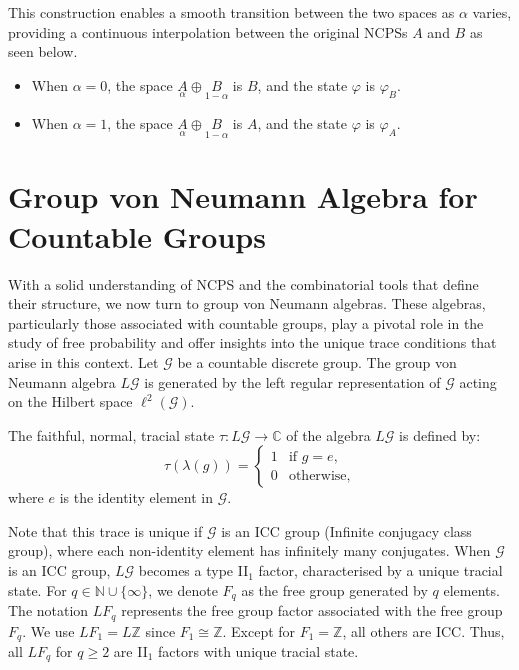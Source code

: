 This construction enables a smooth transition between the two spaces as $\alpha$ varies, providing a continuous interpolation between the original NCPSs $A$ and $B$ as seen below.

\begin{itemize}
    \item When $\alpha=0$, the space $\underset{\alpha}{A} \oplus \underset{1-\alpha}{B}$ is $B$, and the state $\varphi$ is $\varphi_B$.
    \item When $\alpha =1$, the space $\underset{\alpha}{A} \oplus \underset{1-\alpha}{B}$ is $A$, and the state $\varphi$ is $\varphi_A$.
\end{itemize}

\section{Group von Neumann Algebra for Countable Groups}\label{sec:gp-von}
With a solid understanding of NCPS and the combinatorial tools that define their structure, we now turn to group von Neumann algebras. These algebras, particularly those associated with countable groups, play a pivotal role in the study of free probability and offer insights into the unique trace conditions that arise in this context. Let $\mathcal{G}$ be a countable discrete group. The group von Neumann algebra $L\mathcal{G}$ is generated by the left regular representation of $\mathcal{G}$ acting on the Hilbert space $\ell^2(\mathcal{G})$.

The faithful, normal, tracial state $\tau: L\mathcal{G} \rightarrow \mathbb{C}$ of the algebra $L\mathcal{G}$ is defined by:
\[
\tau(\lambda(g)) = \begin{cases} 
1 & \text{if } g = e, \\
0 & \text{otherwise},
\end{cases}
\]
where $e$ is the identity element in $\mathcal{G}$.

Note that this trace is unique if $\mathcal{G}$ is an ICC group (Infinite conjugacy class group), where each non-identity element has infinitely many conjugates. When $\mathcal{G}$ is an ICC group, $L\mathcal{G}$ becomes a type II$_1$ factor, characterised by a unique tracial state. For $q\in \mathbb{N}\cup \{\infty\}$, we denote $F_q$ as the free group generated by $q$ elements. The notation $LF_q$ represents the free group factor associated with the free group $F_q$. We use $LF_1= L \mathbb{Z}$ since $F_1 \cong \mathbb{Z}$. Except for $F_1=\mathbb{Z}$, all others are ICC. Thus, all $LF_q$ for $q \geq 2$ are II$_1$ factors with unique tracial state.

